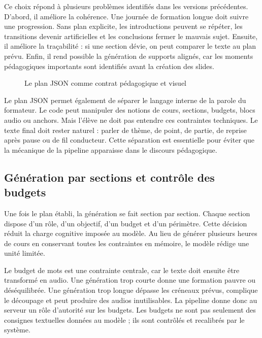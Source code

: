 Ce choix répond à plusieurs problèmes identifiés dans les versions précédentes. D'abord,
il améliore la cohérence. Une journée de formation longue doit suivre une progression.
Sans plan explicite, les introductions peuvent se répéter, les transitions devenir
artificielles et les conclusions fermer le mauvais sujet. Ensuite, il améliore la traçabilité :
si une section dévie, on peut comparer le texte au plan prévu. Enfin, il rend possible la
génération de supports alignés, car les moments pédagogiques importants sont identifiés
avant la création des slides.

\begin{figure}[h]
\centering
{}
\caption{Le plan JSON comme contrat pédagogique et visuel}
\end{figure}

Le plan JSON permet également de séparer le langage interne de la parole du formateur.
Le code peut manipuler des notions de cours, sections, budgets, blocs audio ou anchors.
Mais l'élève ne doit pas entendre ces contraintes techniques. Le texte final doit rester
naturel : parler de thème, de point, de partie, de reprise après pause ou de fil conducteur.
Cette séparation est essentielle pour éviter que la mécanique de la pipeline apparaisse
dans le discours pédagogique.

\subsection{Génération par sections et contrôle des budgets}

Une fois le plan établi, la génération se fait section par section. Chaque section dispose
d'un rôle, d'un objectif, d'un budget et d'un périmètre. Cette décision réduit la charge
cognitive imposée au modèle. Au lieu de générer plusieurs heures de cours en conservant
toutes les contraintes en mémoire, le modèle rédige une unité limitée.

Le budget de mots est une contrainte centrale, car le texte doit ensuite être transformé
en audio. Une génération trop courte donne une formation pauvre ou déséquilibrée. Une
génération trop longue dépasse les créneaux prévus, complique le découpage et peut
produire des audios inutilisables. La pipeline donne donc au serveur un rôle d'autorité sur
les budgets. Les budgets ne sont pas seulement des consignes textuelles données au
modèle ; ils sont contrôlés et recalibrés par le système.


